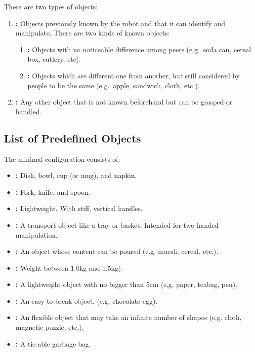 There are two types of objects:

\begin{enumerate}
	\item \textbf{:} Objects previously known by the robot and that it can identify and manipulate.
	There are two kinds of known objects:
	\begin{enumerate}
		\item \textbf{:} Objects with no noticeable difference among peers (e.g.~soda can, cereal box, cutlery, etc).
		\item \textbf{:} Objects which are different one from another, but still considered by people to be the same (e.g.~apple, sandwich, cloth, etc.).
	\end{enumerate}

	\item \textbf{:} Any other object that is not known beforehand but can be grasped or handled.
\end{enumerate}

\subsection{List of Predefined Objects}
\label{rule:scenario_objects_list}
The minimal configuration consists of:
\begin{itemize}
	\item \textbf{:} Dish, bowl, cup (or mug), and napkin.
	\item \textbf{:} Fork, knife, and spoon.
	\item \textbf{:} Lightweight. With stiff, vertical handles.
	\item \textbf{:} A transport object like a tray or basket. Intended for two-handed manipulation.
	\item \textbf{:} An object whose content can be poured (e.g. muesli, cereal, etc.).
	\item \textbf{:} Weight between 1.0kg and 1.5kg).
	\item \textbf{:} A lightweight object with no bigger than 5cm (e.g. paper, teabag, pen).
	\item \textbf{:} An easy-to-break object, (e.g. chocolate egg).
	\item \textbf{:} An flexible object that may take an infinite number of shapes (e.g. cloth, magnetic puzzle, etc.).
	\item \textbf{:} A tie-able garbage bag.
\end{itemize}

